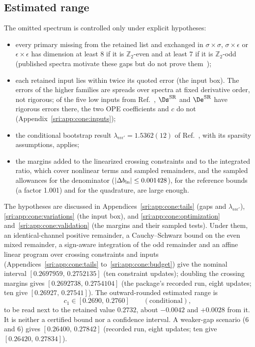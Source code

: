 \subsection{Estimated range}\label{sri:sec:range}
The omitted spectrum is controlled only under explicit hypotheses:
\begin{itemize}
\item every primary missing from the retained list and exchanged in $\sigma\times\sigma$, $\sigma\times\epsilon$ or
 $\epsilon\times\epsilon$ has dimension at least 8 if it is $\mathbb Z_2$-even and at least 7 if it is
 $\mathbb Z_2$-odd (published spectra motivate these gaps but do not prove
 them~\cite{sri:Simmons-Duffin:2016wlq,sri:Henriksson:2022,sri:Zhu:2022,sri:Fardelli:2026});
\item each retained input lies within twice its quoted error (the input box). The errors of the higher families are
 spreads over spectra at fixed derivative order, not rigorous; of the five low inputs from Ref.~\cite{sri:Chang:2024whx},
 $\Ds^{\rm SR}$ and $\De^{\rm SR}$ have rigorous errors there, the two OPE coefficients and $c$ do not
 (Appendix~\ref{sri:app:cone:inputs});
\item the conditional bootstrap result $\lambda_{\epsilon\epsilon\epsilon'}=1.5362(12)$ of Ref.~\cite{sri:Reehorst:2021},
 with its sparsity assumptions, applies;
\item the margins added to the linearized crossing constraints and to the integrated ratio, which cover nonlinear terms
 and sampled remainders, and the sampled allowances for the denominator ($|\Delta b_{\rm in}|\le0.001428$), for the
 reference bounds (a factor 1.001) and for the quadrature, are large enough.
\end{itemize}
The hypotheses are discussed in Appendices~\ref{sri:app:cone:tails} (gaps and $\lambda_{\epsilon\epsilon\epsilon'}$),
\ref{sri:app:cone:variations} (the input box), and \ref{sri:app:cone:optimization} and~\ref{sri:app:cone:validation} (the margins
and their sampled tests).
Under them, an identical-channel positive remainder, a Cauchy--Schwarz bound on the even mixed remainder, a sign-aware
integration of the odd remainder and an affine linear program over crossing constraints and inputs
(Appendices~\ref{sri:app:cone:tails} to~\ref{sri:app:cone:budget}) give the nominal interval $[0.2697959,\,0.2752135]$ (ten
constraint updates); doubling the crossing margins gives $[0.2692738,\,0.2754104]$ (the package's recorded run, eight
updates; ten give $[0.26927,\,0.27541]$). The
outward-rounded estimated range is
\begin{equation}
 c_1\in[0.2690,\,0.2760]\qquad(\text{conditional}),
\end{equation}
to be read next to the retained value $0.2732$, about $-0.0042$ and $+0.0028$ from it. It is neither a certified
bound nor a confidence interval. A weaker-gap scenario (6 and 6) gives $[0.26400,\,0.27842]$ (recorded run, eight updates; ten give
$[0.26420,\,0.27834]$).


